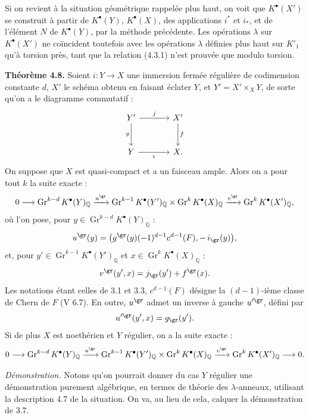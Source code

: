\documentclass[11pt]{article}
\begin{document}
Si on revient à la situation géométrique rappelée plus haut, on voit que \(K^\bullet(X')\) se construit à partir de \(K^\bullet(Y)\), \(K^\bullet(X)\), des applications \(i^*\) et \(i_*\), et de l'élément \(N\) de \(K^\bullet(Y)\), par la méthode précédente. Les opérations \(\lambda\) sur \(K^\bullet(X')\) ne coïncident toutefois avec les opérations \(\lambda\) définies plus haut sur \(K'_1\) qu'à torsion près, tant que la relation (4.3.1) n'est prouvée que modulo torsion.

\textbf{Théorème 4.8.} Soient \(i:Y\to X\) une immersion fermée régulière de codimension constante \(d\), \(X'\) le schéma obtenu en faisant éclater \(Y\), et \(Y'=X'\times_XY\), de sorte qu'on a le diagramme commutatif :
\[
\begin{tikzcd}[column sep=large,row sep=large]
Y' \arrow[r,"j"] \arrow[d,"g"'] & X' \arrow[d,"f"]\\
Y \arrow[r,"i"'] & X.
\end{tikzcd}
\]
On suppose que \(X\) est quasi-compact et a un faisceau ample. Alors on a pour tout \(k\) la suite exacte :
\[
0\longrightarrow
\operatorname{Gr}^{k-d}K^\bullet(Y)_{\mathbb Q}
\xrightarrow{u^{\gr}}
\operatorname{Gr}^{k-1}K^\bullet(Y')_{\mathbb Q}
\times
\operatorname{Gr}^{k}K^\bullet(X)_{\mathbb Q}
\xrightarrow{v^{\gr}}
\operatorname{Gr}^{k}K^\bullet(X')_{\mathbb Q},
\]
où l'on pose, pour \(y\in \operatorname{Gr}^{k-d}K^\bullet(Y)_{\mathbb Q}\) :
\[
  u^{\gr}(y)=
  \bigl(g^{\gr}(y)(-1)^{d-1}c^{d-1}(F),-\,i_{\gr}(y)\bigr),
\]
et, pour \(y'\in \operatorname{Gr}^{k-1}K^\bullet(Y')_{\mathbb Q}\) et \(x\in \operatorname{Gr}^{k}K^\bullet(X)_{\mathbb Q}\) :
\[
  v^{\gr}(y',x)=j_{\gr}(y')+f^{\gr}(x).
\]
Les notations étant celles de 3.1 et 3.3, \(c^{d-1}(F)\) désigne la \((d-1)\)-ième classe de Chern de \(F\) (V 6.7). En outre, \(u^{\gr}\) admet un inverse à gauche \(u'^{\gr}\), défini par
\[
  u'^{\gr}(y',x)=g_{\gr}(y').
\]
Si de plus \(X\) est noethérien et \(Y\) régulier, on a la suite exacte :
\[
0\longrightarrow
\operatorname{Gr}^{k-d}K^\bullet(Y)_{\mathbb Q}
\xrightarrow{u^{\gr}}
\operatorname{Gr}^{k-1}K^\bullet(Y')_{\mathbb Q}
\times
\operatorname{Gr}^{k}K^\bullet(X)_{\mathbb Q}
\xrightarrow{v^{\gr}}
\operatorname{Gr}^{k}K^\bullet(X')_{\mathbb Q}
\longrightarrow0.
\]

\emph{Démonstration.} Notons qu'on pourrait donner du cas \(Y\) régulier une démonstration purement algébrique, en termes de théorie des \(\lambda\)-anneaux, utilisant la description 4.7 de la situation. On va, au lieu de cela, calquer la démonstration de 3.7.
\end{document}
